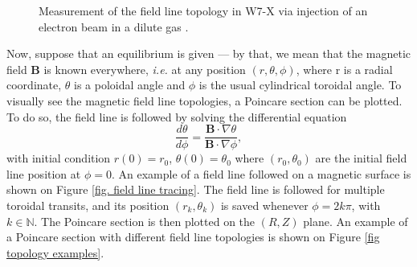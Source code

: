 \documentclass[my_thesis.tex]{subfiles}
\begin{document}
\begin{figure}%
	\centering
	\qquad
	\caption{Measurement of the field line topology in W7-X via injection of an electron beam in a dilute gas \citep{pedersenConfirmationTopologyWendelstein2016}.}
	\label{fig. w7x topology measurement}%
\end{figure}

Now, suppose that an equilibrium is given --- by that, we mean that the magnetic field $\mathbf{B}$ is known everywhere, \textit{i.e.} at any position $(r,\theta,\phi)$, where r is a radial coordinate, $\theta$ is a poloidal angle and $\phi$ is the usual cylindrical toroidal angle. To visually see the magnetic field line topologies, a Poincare section can be plotted. To do so, the field line is followed by solving the differential equation
\begin{equation}
	\frac{d\theta}{d\phi} = \frac{\mathbf{B}\cdot\nabla\theta}{\mathbf{B}\cdot\nabla\phi},
\end{equation}
with initial condition $r(0)=r_0$, $\theta(0)=\theta_0$ where $(r_0,\theta_0)$ are the initial field line position at $\phi=0$. An example of a field line followed on a magnetic surface is shown on Figure \ref{fig. field line tracing}. The field line is followed for multiple toroidal transits, and its position $(r_k,\theta_k)$ is saved whenever $\phi=2k\pi$, with $k\in\mathbb{N}$. The Poincare section is then plotted on the $(R,Z)$ plane. An example of a Poincare section with different field line topologies is shown on Figure \ref{fig topology examples}.
\end{document}
